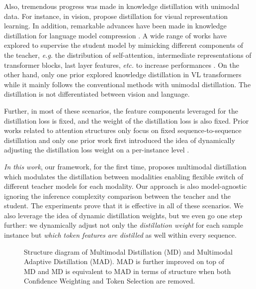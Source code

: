 \documentclass[runningheads]{llncs}
\begin{document}
Also, tremendous progress was made in knowledge distillation with unimodal data. For instance, in vision, \cite{tian2020contrastive,fang2021seed} propose distillation for visual representation learning. In addition, remarkable advances have been made in knowledge distillation for language model compression \cite{sanh2019distilbert,jiao2019tinybert,sun2020mobilebert}. A wide range of works have explored to supervise the student model by mimicking different components of the teacher, \textit{e.g.} the distribution of self-attention, intermediate representations of transformer blocks, last layer features, \textit{etc.} to increase performances \cite{xu2020bert,sun2020contrastive,chen2021wasserstein}. On the other hand, only one prior explored knowledge distillation in VL transformers \cite{fang2021compressing} while it mainly follows the conventional methods with unimodal distillation. The distillation is not differentiated between vision and language.

Further, in most of these scenarios, the feature components leveraged for the distillation loss is fixed, and the weight of the distillation loss is also fixed. Prior works related to attention structures only focus on fixed sequence-to-sequence distillation \cite{sun2019patient} and only one prior work first introduced the idea of dynamically adjusting the distillation loss weight on a per-instance level \cite{furlanello2018born}.






{\em In this work}, our framework, for the first time, proposes multimodal distillation which modulates the distillation between modalities enabling flexible switch of different teacher models for each modality. Our approach is also model-agnostic ignoring the inference complexity comparison between the teacher and the student. The experiments prove that it is effective in all of these scenarios. We also leverage the idea of dynamic distillation weights, but we even go one step further: we dynamically adjust not only the {\em distillation weight} for each sample instance but {\em which token features are distilled} as well within every sequence.


\begin{figure*}[htpb]
\caption{Structure diagram of Multimodal Distillation (MD) and Multimodal Adaptive Distillation (MAD). MAD is further improved on top of MD and MD is equivalent to MAD in terms of structure when both Confidence Weighting and Token Selection are removed.}
\label{fig:diagram2}
\end{figure*}
\end{document}
